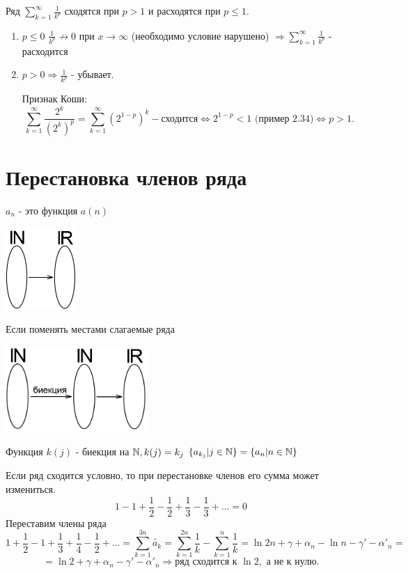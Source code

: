 	\begin{example}
		Ряд $\sum^{\infty}_{k = 1} \frac{1}{k^p}$ сходятся при $p > 1$ и расходятся при $p \leqslant 1$.
	\end{example}
	
	\begin{enumerate}
		\item $p \leqslant 0$ $\frac{1}{k^p} \not\to 0$ при $x \to \infty$ (необходимо условие нарушено) $\Rightarrow \sum^{\infty}_{k = 1} \frac{1}{k^p}$ - расходится
		\item $p > 0 \Rightarrow \frac{1}{k^p}$ - убывает.
		
		Признак Коши: 
		\[ \sum_{k = 1}^{\infty} \frac{2^k}{(2^k)^p} = \sum_{k = 1}^{\infty} (2^{1 - p})^k - \text{сходится} \Leftrightarrow 2^{1 - p} < 1 \text{ (пример 2.34)} \Leftrightarrow p > 1. \]
	\end{enumerate}
	
	\section{Перестановка членов ряда}
	
	$a_n$ - это функция $a(n)$
	\begin{center}
		\includegraphics[width=0.2\textwidth]{img/lecture8/sequence}
	\end{center}
	Если поменять местами слагаемые ряда
	\begin{center}
		\includegraphics[width=0.4\textwidth]{img/lecture8/replacement_summands}
	\end{center}
	Функция $k(j)$ - биекция на $\mathbb N, k(j) = k_j$ $\{a_{k_j} | j \in \mathbb N\} = \{a_n | n \in \mathbb N\}$
	
	\begin{example}
		Если ряд сходится условно, то при перестановке членов его сумма может измениться.
		\[ 1 - 1 + \frac{1}{2} - \frac{1}{2} + \frac{1}{3} - \frac{1}{3} + \dots = 0 \]
		Переставим члены ряда
		\[ 1 + \frac{1}{2} - 1 + \frac{1}{3} + \frac{1}{4} - \frac{1}{2} + \dots = \sum_{k = 1}^{3n} \tilde{a_k} = \sum_{k = 1}^{2n} \frac{1}{k} - \sum_{k = 1}^n \frac{1}{k} = \ln{2n} + \gamma + \alpha_n - \ln{n} - \gamma' - \alpha'_n = \]
		\[ = \ln{2} + \gamma + \alpha_n - \gamma' - \alpha'_n \Rightarrow \text{ряд сходится к } \ln{2}, \text{ а не к нулю.} \]
	\end{example}
		

